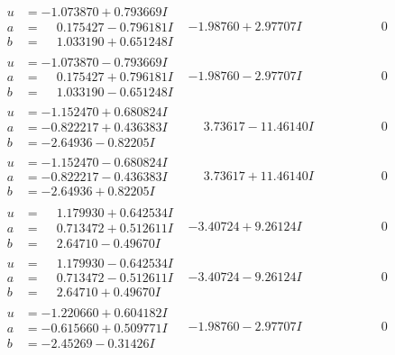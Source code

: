 \documentclass[1p]{elsarticle_modified}
\theoremstyle{definition}
\begin{document}
$$\begin{array}{c|c|c}
\begin{aligned}
u &= -1.073870 + 0.793669 I \\
a &= \phantom{-}0.175427 - 0.796181 I \\
b &= \phantom{-}1.033190 + 0.651248 I\end{aligned}
 & -1.98760 + 2.97707 I & \phantom{-0.000000 } 0 \\ \hline\begin{aligned}
u &= -1.073870 - 0.793669 I \\
a &= \phantom{-}0.175427 + 0.796181 I \\
b &= \phantom{-}1.033190 - 0.651248 I\end{aligned}
 & -1.98760 - 2.97707 I & \phantom{-0.000000 } 0 \\ \hline\begin{aligned}
u &= -1.152470 + 0.680824 I \\
a &= -0.822217 + 0.436383 I \\
b &= -2.64936 - 0.82205 I\end{aligned}
 & \phantom{-}3.73617 - 11.46140 I & \phantom{-0.000000 } 0 \\ \hline\begin{aligned}
u &= -1.152470 - 0.680824 I \\
a &= -0.822217 - 0.436383 I \\
b &= -2.64936 + 0.82205 I\end{aligned}
 & \phantom{-}3.73617 + 11.46140 I & \phantom{-0.000000 } 0 \\ \hline\begin{aligned}
u &= \phantom{-}1.179930 + 0.642534 I \\
a &= \phantom{-}0.713472 + 0.512611 I \\
b &= \phantom{-}2.64710 - 0.49670 I\end{aligned}
 & -3.40724 + 9.26124 I & \phantom{-0.000000 } 0 \\ \hline\begin{aligned}
u &= \phantom{-}1.179930 - 0.642534 I \\
a &= \phantom{-}0.713472 - 0.512611 I \\
b &= \phantom{-}2.64710 + 0.49670 I\end{aligned}
 & -3.40724 - 9.26124 I & \phantom{-0.000000 } 0 \\ \hline\begin{aligned}
u &= -1.220660 + 0.604182 I \\
a &= -0.615660 + 0.509771 I \\
b &= -2.45269 - 0.31426 I\end{aligned}
 & -1.98760 - 2.97707 I & \phantom{-0.000000 } 0 \\ \hline\begin{aligned}

\end{aligned}
\end{array}$$
\end{document}

